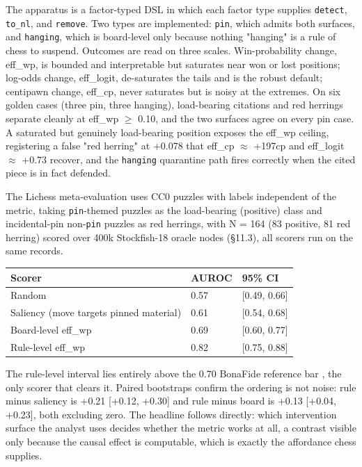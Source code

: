 \documentclass[conference]{IEEEtran}
\begin{document}
The apparatus is a factor-typed DSL in which each factor type supplies \texttt{detect}, \texttt{to\_nl}, and \texttt{remove}. Two types are implemented: \texttt{pin}, which admits both surfaces, and \texttt{hanging}, which is board-level only because nothing "hanging" is a rule of chess to suspend. Outcomes are read on three scales. Win-probability change, eff\_wp, is bounded and interpretable but saturates near won or lost positions; log-odds change, eff\_logit, de-saturates the tails and is the robust default; centipawn change, eff\_cp, never saturates but is noisy at the extremes. On six golden cases (three pin, three hanging), load-bearing citations and red herrings separate cleanly at eff\_wp $\ge$ 0.10, and the two surfaces agree on every pin case. A saturated but genuinely load-bearing position exposes the eff\_wp ceiling, registering a false "red herring" at +0.078 that eff\_cp $\approx$ +197cp and eff\_logit $\approx$ +0.73 recover, and the \texttt{hanging} quarantine path fires correctly when the cited piece is in fact defended.

The Lichess meta-evaluation uses CC0 puzzles with labels independent of the metric, taking \texttt{pin}-themed puzzles as the load-bearing (positive) class and incidental-pin non-\texttt{pin} puzzles as red herrings, with N = 164 (83 positive, 81 red herring) scored over 400k Stockfish-18 oracle nodes (\S{}11.3), all scorers run on the same records.

\begin{table}[h]\centering
\begin{tabular}{lll}
\hline
\textbf{Scorer} & \textbf{AUROC} & \textbf{95\% CI} \\
\hline
Random & 0.57 & [0.49, 0.66] \\
Saliency (move targets pinned material) & 0.61 & [0.54, 0.68] \\
Board-level eff\_wp & 0.69 & [0.60, 0.77] \\
Rule-level eff\_wp & 0.82 & [0.75, 0.88] \\
\hline
\end{tabular}
\end{table}
The rule-level interval lies entirely above the 0.70 BonaFide reference bar \cite{ref14}, the only scorer that clears it. Paired bootstraps confirm the ordering is not noise: rule minus saliency is +0.21 [+0.12, +0.30] and rule minus board is +0.13 [+0.04, +0.23], both excluding zero. The headline follows directly: which intervention surface the analyst uses decides whether the metric works at all, a contrast visible only because the causal effect is computable, which is exactly the affordance chess supplies.
\end{document}

